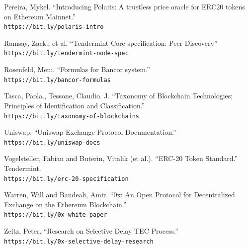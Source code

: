\documentclass[10pt]{article}
\begin{document}
\begin{thebibliography}{9}
Pereira, Mykel. ``Introducing Polaris: A trustless price oracle for ERC20 tokens on Ethereum Mainnet.''
\\\texttt{https://bit.ly/polaris-intro}

Ramsay, Zack., et al. ``Tendermint Core specification: Peer Discovery''
\\\texttt{https://bit.ly/tendermint-node-spec}

Rosenfeld, Meni. ``Formulas for Bancor system.''
\\\texttt{https://bit.ly/bancor-formulas}

Tasca, Paola., Tessone, Claudio. J. ``Taxonomy of Blockchain Technologies; Principles of Identification and Classification.''
\\\texttt{https://bit.ly/taxonomy-of-blockchains}

Uniswap. ``Uniswap Exchange Protocol Documentation.''
\\\texttt{https://bit.ly/uniswap-docs}

Vogelsteller, Fabian and Buterin, Vitalik (et al.). ``ERC-20 Token Standard.'' Tendermint.
\\\texttt{https://bit.ly/erc-20-specification}

Warren, Will and Bandeali, Amir. ``0x: An Open Protocol for Decentralized Exchange on the Ethereum Blockchain.''
\\\texttt{https://bit.ly/0x-white-paper}

Zeitz, Peter. ``Research on Selective Delay TEC Process.''
\\\texttt{https://bit.ly/0x-selective-delay-research}

\end{thebibliography}


\end{document}
